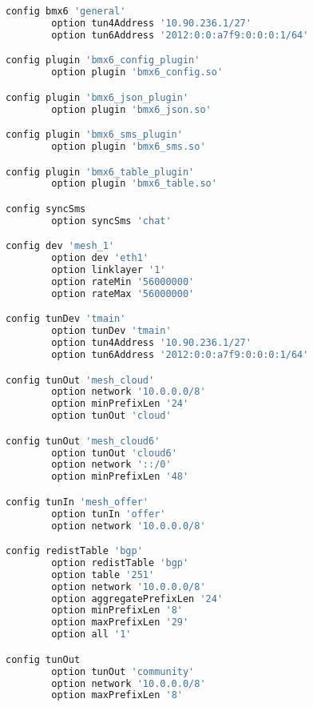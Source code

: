 \begin{lstlisting}[language=bash, caption={BMX6}]
config bmx6 'general'
        option tun4Address '10.90.236.1/27'
        option tun6Address '2012:0:0:a7f9:0:0:0:1/64'

config plugin 'bmx6_config_plugin'
        option plugin 'bmx6_config.so'

config plugin 'bmx6_json_plugin'
        option plugin 'bmx6_json.so'

config plugin 'bmx6_sms_plugin'
        option plugin 'bmx6_sms.so'

config plugin 'bmx6_table_plugin'
        option plugin 'bmx6_table.so'

config syncSms
        option syncSms 'chat'

config dev 'mesh_1'
        option dev 'eth1'
        option linklayer '1'
        option rateMin '56000000'
        option rateMax '56000000'

config tunDev 'tmain'
        option tunDev 'tmain'
        option tun4Address '10.90.236.1/27'
        option tun6Address '2012:0:0:a7f9:0:0:0:1/64'

config tunOut 'mesh_cloud'
        option network '10.0.0.0/8'
        option minPrefixLen '24'
        option tunOut 'cloud'

config tunOut 'mesh_cloud6'
        option tunOut 'cloud6'
        option network '::/0'
        option minPrefixLen '48'

config tunIn 'mesh_offer'
        option tunIn 'offer'
        option network '10.0.0.0/8'

config redistTable 'bgp'
        option redistTable 'bgp'
        option table '251'
        option network '10.0.0.0/8'
        option aggregatePrefixLen '24'
        option minPrefixLen '8'
        option maxPrefixLen '29'
        option all '1'

config tunOut
        option tunOut 'community'
        option network '10.0.0.0/8'
        option maxPrefixLen '8'
\end{lstlisting}